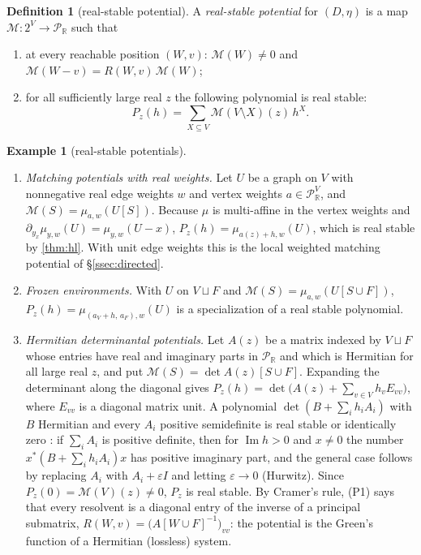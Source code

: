 \documentclass[11pt]{amsart}
\theoremstyle{plain}
\theoremstyle{definition}
\newtheorem{definition}[theorem]{Definition}
\newtheorem{example}[theorem]{Example}
\theoremstyle{remark}
\numberwithin{equation}{section}
\newcommand{\RR}{\mathbb{R}}
\newcommand{\Puis}{\mathcal{P}_{\RR}}
\newcommand{\Mpot}{\mathcal{M}}           %
\renewcommand{\Im}{\operatorname{Im}}
\begin{document}
\begin{definition}[real-stable potential]\label{def:real-stable}
A \emph{real-stable potential} for $(D,\eta)$ is a map $\Mpot\colon2^V\to\Puis$ such that
\begin{enumerate}[label=\textup{(P\arabic*)}]
\item at every reachable position $(W,v)$: $\Mpot(W)\neq0$ and $\Mpot(W-v)=R(W,v)\,\Mpot(W)$;
\item for all sufficiently large real $z$ the following polynomial is real stable:
\[
P_z(h)=\sum_{X\subseteq V}\Mpot(V\setminus X)(z)\,h^X.
\]
\end{enumerate}
\end{definition}

\begin{example}[real-stable potentials]\label{ex:real-stable}
\begin{enumerate}[label=(\alph*)]
\item \emph{Matching potentials with real weights.} Let $U$ be a graph on $V$ with nonnegative real edge weights $w$ and vertex weights $a\in\Puis^V$, and $\Mpot(S)=\mu_{a,w}(U[S])$. Because $\mu$ is multi-affine in the vertex weights and $\partial_{y_x}\mu_{y,w}(U)=\mu_{y,w}(U-x)$, $P_z(h)=\mu_{a(z)+h,w}(U)$, which is real stable by \cref{thm:hl}. With unit edge weights this is the local weighted matching potential of \S\ref{ssec:directed}.
\item \emph{Frozen environments.} With $U$ on $V\sqcup F$ and $\Mpot(S)=\mu_{a,w}(U[S\cup F])$, $P_z(h)=\mu_{(a_V+h,\,a_F),w}(U)$ is a specialization of a real stable polynomial.
\item \emph{Hermitian determinantal potentials.} Let $A(z)$ be a matrix indexed by $V\sqcup F$ whose entries have real and imaginary parts in $\Puis$ and which is Hermitian for all large real $z$, and put $\Mpot(S)=\det A(z)[S\cup F]$. Expanding the determinant along the diagonal gives $P_z(h)=\det\bigl(A(z)+\sum_{v\in V}h_vE_{vv}\bigr)$, where $E_{vv}$ is a diagonal matrix unit. A polynomial $\det(B+\sum_ih_iA_i)$ with $B$ Hermitian and every $A_i$ positive semidefinite is real stable or identically zero \cite[Prop.~2.4]{BorceaBranden}: if $\sum_iA_i$ is positive definite, then for $\Im h>0$ and $x\neq0$ the number $x^{*}(B+\sum_ih_iA_i)x$ has positive imaginary part, and the general case follows by replacing $A_i$ with $A_i+\varepsilon I$ and letting $\varepsilon\to0$ (Hurwitz). Since $P_z(0)=\Mpot(V)(z)\neq0$, $P_z$ is real stable. By Cramer's rule, \textup{(P1)} says that every resolvent is a diagonal entry of the inverse of a principal submatrix, $R(W,v)=\bigl(A[W\cup F]^{-1}\bigr)_{vv}$: the potential is the Green's function of a Hermitian (lossless) system.
\end{enumerate}
\end{example}
\end{document}
